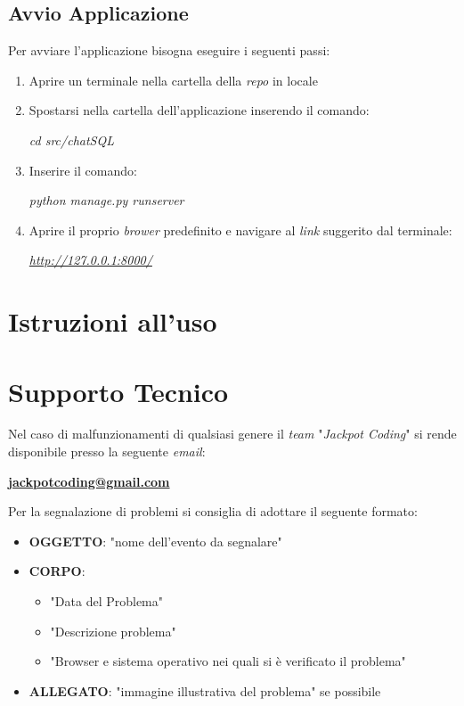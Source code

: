\documentclass[5pt]{article}
\begin{document}
		\subsection{Avvio Applicazione}
			Per avviare l'applicazione bisogna eseguire i seguenti passi:
			\begin{enumerate}
				\item Aprire un terminale nella cartella della \textit{repo} in locale
				\item Spostarsi nella cartella dell'applicazione inserendo il comando:
					\begin{center}
						\textit{cd src/chatSQL}
					\end{center}
				\item Inserire il comando:
					\begin{center}
						\textit{python manage.py runserver}
					\end{center}
				\item Aprire il proprio \textit{brower} predefinito e navigare al \textit{link} suggerito dal terminale:
					\begin{center}
						\textit{\url{http://127.0.0.1:8000/}}
					\end{center}
			\end{enumerate}
 
    \section{Istruzioni all'uso}
        
	\section{Supporto Tecnico}
		Nel caso di malfunzionamenti di qualsiasi genere il \textit{team} "\textit{Jackpot Coding}" si rende disponibile presso la seguente \textit{email}:
		\begin{center}
			\textbf{\url{jackpotcoding@gmail.com}}
		\end{center}

		Per la segnalazione di problemi si consiglia di adottare il seguente formato:
		\begin{itemize}
			\item \textbf{OGGETTO}: "nome dell'evento da segnalare"
			\item \textbf{CORPO}:
			\begin{itemize}
				\item "Data del Problema"
				\item "Descrizione problema"
				\item "Browser e sistema operativo nei quali si è verificato il problema"
			\end{itemize}
			\item \textbf{ALLEGATO}: "immagine illustrativa del problema" se possibile
		\end{itemize}
        
\end{document}
